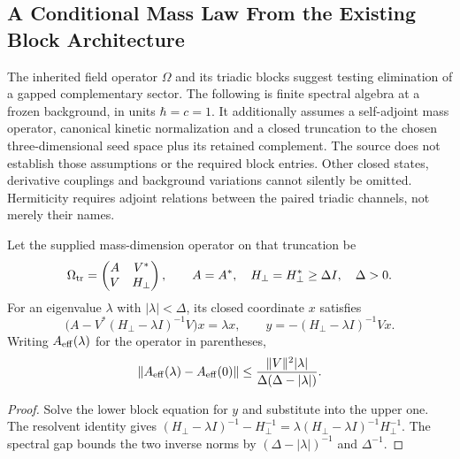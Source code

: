 \subsection{A Conditional Mass Law From the Existing Block Architecture}
\label{v480:native-block-mass-law}

The inherited field operator $\Omega$ and its triadic blocks suggest
testing elimination of a gapped complementary sector. The following
is finite spectral algebra at a frozen background, in units
$\hbar=c=1$. It additionally assumes a self-adjoint mass operator,
canonical kinetic normalization and a closed truncation to the chosen
three-dimensional seed space plus its retained complement. The source
does not establish those assumptions or the required block entries.
Other closed states, derivative couplings and background variations
cannot silently be omitted. Hermiticity requires adjoint relations
between the paired triadic channels, not merely their names.

\begin{proposition}
\label{v480:native-schur-mass}
Let the supplied mass-dimension operator on that truncation be
\[
 \Omega_{\rm tr}=\begin{pmatrix}A&V^*\\V&H_\perp\end{pmatrix},
 \qquad A=A^*,\quad H_\perp=H_\perp^*\geq\Delta I,
 \quad \Delta>0.
\]
For an eigenvalue $\lambda$ with $|\lambda|<\Delta$, its closed
coordinate $x$ satisfies
\[
 \bigl(A-V^*(H_\perp-\lambda I)^{-1}V\bigr)x=\lambda x,
 \qquad y=-(H_\perp-\lambda I)^{-1}Vx.
\]
Writing $A_{\rm eff}(\lambda)$ for the operator in parentheses,
\[
 \|A_{\rm eff}(\lambda)-A_{\rm eff}(0)\|
 \leq\frac{\|V\|^2|\lambda|}{\Delta(\Delta-|\lambda|)}.
\]
\end{proposition}
\begin{proof}
Solve the lower block equation for $y$ and substitute into the
upper one. The resolvent identity gives
$(H_\perp-\lambda I)^{-1}-H_\perp^{-1}
=\lambda(H_\perp-\lambda I)^{-1}H_\perp^{-1}$.
The spectral gap bounds the two inverse norms by
$(\Delta-|\lambda|)^{-1}$ and $\Delta^{-1}$.
\end{proof}

